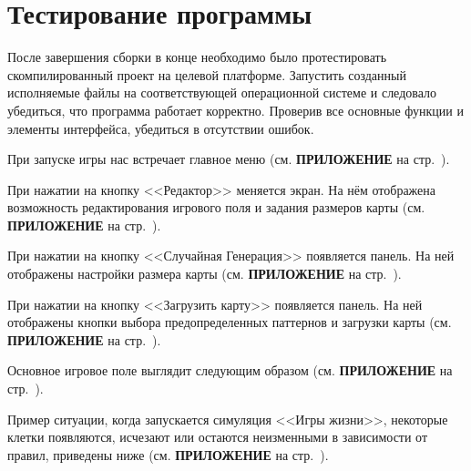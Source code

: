 \section{\label{sec:ch02/sec01/sub06}Тестирование программы}

После завершения сборки в конце необходимо было протестировать скомпилированный проект на целевой платформе. Запустить созданный исполняемые файлы на соответствующей операционной системе и следовало убедиться, что программа работает корректно. Проверив все основные функции и элементы интерфейса, убедиться в отсутствии ошибок. 

При запуске игры нас встречает главное меню (см. \textbf{\textsc{ПРИЛОЖЕНИЕ}} на стр.~\pageref{MainM}).

При нажатии на кнопку <<Редактор>> меняется экран. На нём отображена возможность редактирования игрового поля и задания размеров карты (см. \textbf{\textsc{ПРИЛОЖЕНИЕ}} на стр.~\pageref{Editor}). 

При нажатии на кнопку <<Случайная Генерация>> появляется панель. На ней отображены настройки размера карты (см. \textbf{\textsc{ПРИЛОЖЕНИЕ}} на стр.~\pageref{rand}). 

При нажатии на кнопку <<Загрузить карту>> появляется панель. На ней отображены кнопки выбора предопределенных паттернов и загрузки карты (см. \textbf{\textsc{ПРИЛОЖЕНИЕ}} на стр.~\pageref{downl}). 

Основное игровое поле выглядит следующим образом (см. \textbf{\textsc{ПРИЛОЖЕНИЕ}} на стр.~\pageref{map}).

Пример ситуации, когда запускается симуляция <<Игры жизни>>, некоторые клетки появляются, исчезают или остаются неизменными в зависимости от правил, приведены ниже (см. \textbf{\textsc{ПРИЛОЖЕНИЕ}} на стр.~\pageref{uim}).